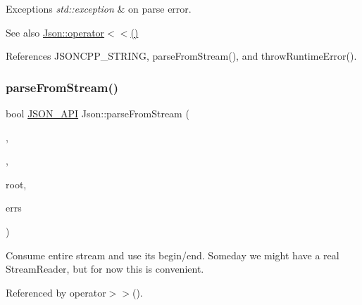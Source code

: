 \begin{DoxyExceptions}{Exceptions}
{\em std\+::exception} & on parse error. \\
\hline
\end{DoxyExceptions}
\begin{DoxySeeAlso}{See also}
\hyperlink{namespaceJson_a975d1dbca8aa7a06f38d373edcb9081c_a975d1dbca8aa7a06f38d373edcb9081c}{Json\+::operator$<$$<$()} 
\end{DoxySeeAlso}


References J\+S\+O\+N\+C\+P\+P\+\_\+\+S\+T\+R\+I\+NG, parse\+From\+Stream(), and throw\+Runtime\+Error().

\mbox{\label{namespaceJson_aab0cf1ecf81d1aeca12be2a416a84352_aab0cf1ecf81d1aeca12be2a416a84352}} 
\subsubsection{\texorpdfstring{parse\+From\+Stream()}{parseFromStream()}\hspace{0.1cm}{\footnotesize\ttfamily [1/2]}}
{\footnotesize\ttfamily bool \hyperlink{json_8h_a1d61ffde86ce1a18fd83194ff0d9a206_a1d61ffde86ce1a18fd83194ff0d9a206}{J\+S\+O\+N\+\_\+\+A\+PI} Json\+::parse\+From\+Stream (\begin{DoxyParamCaption}\item[{\hyperlink{classJson_1_1CharReader_1_1Factory}{Char\+Reader\+::\+Factory} const \&}]{,  }\item[{\hyperlink{json_8h_a15f2f70b2ce0a2abd0f8112393dbc4de_a15f2f70b2ce0a2abd0f8112393dbc4de}{J\+S\+O\+N\+C\+P\+P\+\_\+\+I\+S\+T\+R\+E\+AM} \&}]{,  }\item[{\hyperlink{classJson_1_1Value}{Value} $\ast$}]{root,  }\item[{std\+::string $\ast$}]{errs }\end{DoxyParamCaption})}

Consume entire stream and use its begin/end. Someday we might have a real Stream\+Reader, but for now this is convenient. 

Referenced by operator$>$$>$().

\mbox{\label{namespaceJson_a38f903cfdb57a6c4e86a7dcc42f3712c_a38f903cfdb57a6c4e86a7dcc42f3712c}} 
